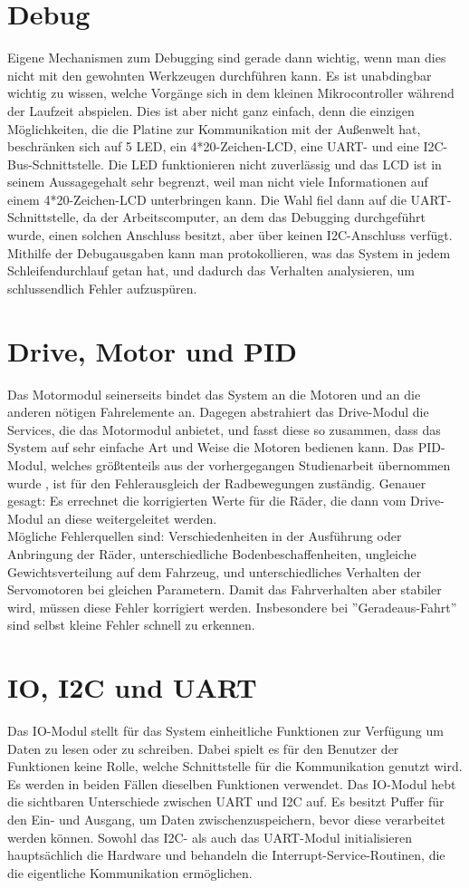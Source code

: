 \section{Debug}
Eigene Mechanismen zum Debugging sind gerade dann wichtig, wenn man dies nicht mit den
gewohnten Werkzeugen durchführen kann.
Es ist unabdingbar wichtig zu wissen, welche Vorgänge sich in dem kleinen Mikrocontroller
während der Laufzeit abspielen.
Dies ist aber nicht ganz einfach, denn die einzigen Möglichkeiten, die die Platine zur
Kommunikation mit der Außenwelt hat, beschränken sich auf
5 LED, ein 4*20-Zeichen-LCD, eine UART- und eine I2C-Bus-Schnittstelle.
Die LED funktionieren nicht zuverlässig und das LCD ist in seinem Aussagegehalt sehr
begrenzt, weil man nicht viele Informationen auf einem 4*20-Zeichen-LCD unterbringen kann. 
Die Wahl fiel dann auf
die UART-Schnittstelle, da der Arbeitscomputer, an dem das Debugging durchgeführt wurde,
einen solchen Anschluss besitzt, aber über keinen I2C-Anschluss verfügt.
Mithilfe der Debugausgaben kann man protokollieren, was das System in jedem
Schleifendurchlauf getan hat, und dadurch das Verhalten analysieren, um schlussendlich
Fehler aufzuspüren. 
\section{Drive, Motor und PID}
Das Motormodul seinerseits bindet das System an die Motoren und an die anderen nötigen
Fahrelemente an. Dagegen abstrahiert das Drive-Modul die Services, die das Motormodul anbietet,
und fasst diese so zusammen, dass das System auf sehr einfache Art und Weise die Motoren bedienen
kann.
Das PID-Modul, welches größtenteils aus der vorhergegangen Studienarbeit übernommen wurde
\cite{STUD_TIMO}, ist für den Fehlerausgleich der Radbewegungen zuständig. Genauer gesagt: Es
errechnet die korrigierten Werte für die Räder, die dann vom Drive-Modul an diese 
weitergeleitet werden.\\
Mögliche Fehlerquellen sind: Verschiedenheiten in der Ausführung oder Anbringung der Räder,
unterschiedliche Bodenbeschaffenheiten,
ungleiche Gewichtsverteilung auf dem Fahrzeug, und unterschiedliches Verhalten der
Servomotoren bei gleichen Parametern.
Damit das Fahrverhalten aber stabiler wird, müssen diese Fehler korrigiert werden.
Insbesondere bei ''Geradeaus-Fahrt'' sind selbst kleine Fehler schnell zu erkennen.
\section{IO, I2C und UART}
Das IO-Modul stellt für das System einheitliche Funktionen zur Verfügung um Daten zu lesen
oder zu schreiben. 
Dabei spielt es für den Benutzer der Funktionen keine Rolle, welche Schnittstelle
für die Kommunikation genutzt wird.
Es werden in beiden Fällen dieselben Funktionen verwendet.
Das IO-Modul hebt die sichtbaren Unterschiede zwischen UART und I2C auf. Es besitzt Puffer für den
Ein- und Ausgang, um Daten zwischenzuspeichern, bevor diese verarbeitet werden können.
Sowohl das I2C- als auch das UART-Modul initialisieren hauptsächlich die Hardware und
behandeln die Interrupt-Service-Routinen, die die eigentliche Kommunikation ermöglichen.

